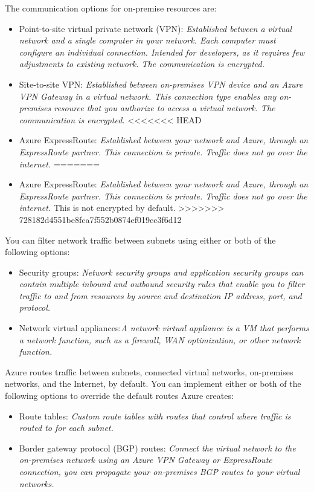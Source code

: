 The communication options for on-premise resources are:
\begin{itemize}
\item Point-to-site virtual private network (VPN): \textit{Established between a virtual network and a single computer in your network. Each computer must configure an individual connection. Intended for developers, as it requires few adjustments to existing network. The communication is encrypted.}
\item Site-to-site VPN: \textit{Established between on-premises VPN device and an Azure VPN Gateway in a virtual network. This connection type enables any on-premises resource that you authorize to access a virtual network. The communication is encrypted.}
<<<<<<< HEAD
\item Azure ExpressRoute: \textit{Established between your network and Azure, through an ExpressRoute partner. This connection is private. Traffic does not go over the internet.}
=======
\item Azure ExpressRoute: \textit{Established between your network and Azure, through an ExpressRoute partner. This connection is private. Traffic does not go over the internet.} This is not encrypted by default.
>>>>>>> 728182d4551be8fca7f552b0874ef019cc3f6d12
\end{itemize}

You can filter network traffic between subnets using either or both of the following options:
\begin{itemize}
\item Security groups: \textit{Network security groups and application security groups can contain multiple inbound and outbound security rules that enable you to filter traffic to and from resources by source and destination IP address, port, and protocol.}
\item Network virtual appliances:\textit{A network virtual appliance is a VM that performs a network function, such as a firewall, WAN optimization, or other network function.}
\end{itemize}

Azure routes traffic between subnets, connected virtual networks, on-premises networks, and the Internet, by default. You can implement either or both of the following options to override the default routes Azure creates:
\begin{itemize}
\item Route tables: \textit{Custom route tables with routes that control where traffic is routed to for each subnet.}
\item Border gateway protocol (BGP) routes: \textit{Connect the virtual network to the on-premises network using an Azure VPN Gateway or ExpressRoute connection, you can propagate your on-premises BGP routes to your virtual networks. }
\end{itemize}

